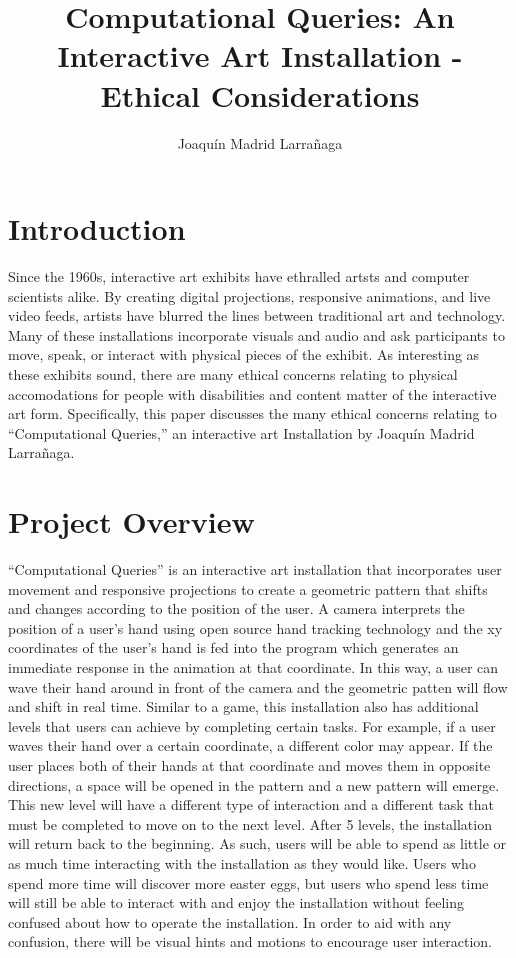 \documentclass[10pt,twocolumn]{article}
\title{Computational Queries: An Interactive Art Installation - Ethical Considerations}
\author{Joaquín Madrid Larrañaga}
\affiliation{Occidental College}
\begin{document}
\maketitle

\section{Introduction}\label{sec:intro}

Since the 1960s, interactive art exhibits have ethralled artsts and computer scientists alike\cite{trifonova_software_2008}.  By creating digital projections, responsive animations, and live video feeds, artists have blurred the lines between traditional art and technology.  Many of these installations incorporate visuals and audio and ask participants to move, speak, or interact with physical pieces of the exhibit.  As interesting as these exhibits sound, there are many ethical concerns relating to physical accomodations for people with disabilities and content matter of the interactive art form. Specifically, this paper discusses the many ethical concerns relating to ``Computational Queries,'' an interactive art Installation by Joaquín Madrid Larrañaga. 

\section{Project Overview}\label{sec:overview}

``Computational Queries'' is an interactive art installation that incorporates user movement and responsive projections to create a geometric pattern that shifts and changes according to the position of the user.  A camera interprets the position of a user's hand using open source hand tracking technology and the xy coordinates of the user's hand is fed into the program which generates an immediate response in the animation at that coordinate. In this way, a user can wave their hand around in front of the camera and the geometric patten will flow and shift in real time. Similar to a game, this installation also has additional levels that users can achieve by completing certain tasks.  For example, if a user waves their hand over a certain coordinate, a different color may appear.  If the user places both of their hands at that coordinate and moves them in opposite directions, a space will be opened in the pattern and a new pattern will emerge.  This new level will have a different type of interaction and a different task that must be completed to move on to the next level.  After 5 levels, the installation will return back to the beginning.  As such, users will be able to spend as little or as much time interacting with the installation as they would like. Users who spend more time will discover more easter eggs, but users who spend less time will still be able to interact with and enjoy the installation without feeling confused about how to operate the installation.  In order to aid with any confusion, there will be visual hints and motions to encourage user interaction. 
\end{document}
